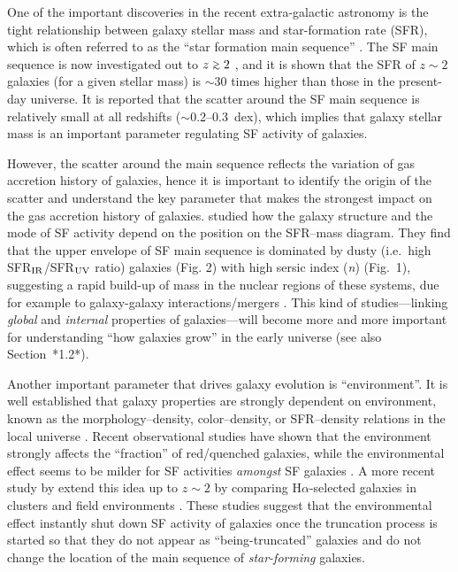 One of the important discoveries in the recent extra-galactic
astronomy is the tight relationship between galaxy stellar mass and
star-formation rate (SFR), which is often referred to as the ``star
formation main sequence'' \citep[e.g.,][]{Brinchmann04, elbaz07, daddi07}.
The SF main sequence is now investigated out
to $z\gsim 2$ \citep[e.g.,][]{whitaker12}, and it is shown that the
SFR of $z\sim 2$ galaxies (for a given stellar mass) is $\sim$30 times
higher than those in the present-day universe. It is reported that the
scatter around the SF main sequence is relatively small at all redshifts
($\sim$0.2--0.3~dex), which implies that galaxy stellar mass is an
important parameter regulating SF activity of galaxies.

However, the scatter around the main sequence reflects the variation
of gas accretion history of galaxies, hence it is important to
identify the origin of the scatter and understand the key parameter
that makes the strongest impact on the gas accretion history of
galaxies. \citet{wuyts11} studied how the galaxy structure and the
mode of SF activity depend on the position on the SFR--mass diagram.
They find that the upper envelope of SF main sequence is dominated by
dusty (i.e.\ high SFR$_{\rm IR}$/SFR$_{\rm UV}$ ratio) galaxies (Fig. 2)
with high sersic index ({\it n}) (Fig.\ 1), suggesting a rapid build-up
of mass in the nuclear regions of these systems, due for example to
galaxy-galaxy interactions/mergers \citep{wuyts11}.
This kind of studies---linking {\it global} and {\it internal} properties
of galaxies---will become more and more important for understanding 
``how galaxies grow'' in the early universe (see also Section~*1.2*).

Another important parameter that drives galaxy evolution is
``environment''. It is well established that galaxy properties are
strongly dependent on environment, known as the morphology--density,
color--density, or SFR--density relations in the local universe 
\citep[e.g.,][]{dressler1980, lewis2002, gomez2003}.
Recent 
observational studies have shown that the environment strongly affects
the ``fraction'' of red/quenched galaxies, while the environmental
effect seems to be milder for SF activities {\it amongst} SF galaxies
\citep{balogh2004,peng2010}. A more recent study by \citet{koyama13b}
extend this idea up to $z\sim 2$ by comparing
H$\alpha$-selected galaxies in clusters and field environments
\citep[Fig.3,][]{koyama13b}.
These studies suggest that the environmental effect instantly shut down SF
activity of galaxies once the truncation process is started
so that they do not appear as ``being-truncated'' galaxies and do not change
the location of the main sequence of {\it star-forming} galaxies.

